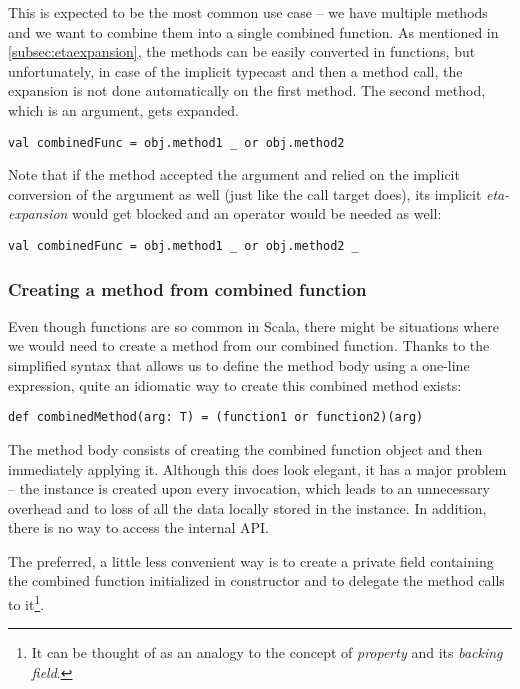 This is expected to be the most common use case -- we have multiple methods and we want to combine them into a single combined function. As mentioned in \ref{subsec:etaexpansion}, the methods can be easily converted in functions, but unfortunately, in case of the implicit typecast and then a method call, the expansion is not done automatically on the first method. The second method, which is an argument, gets expanded.

\lstset{style=Scala}
\begin{lstlisting}
val combinedFunc = obj.method1 _ or obj.method2
\end{lstlisting}

Note that if the  method accepted the  argument and relied on the implicit conversion of the argument as well (just like the call target does), its implicit \textit{eta-expansion} would get blocked and an operator \inlinecode{\_} would be needed as well:

\lstset{style=Scala}
\begin{lstlisting}
val combinedFunc = obj.method1 _ or obj.method2 _
\end{lstlisting}

\subsubsection{Creating a method from combined function}
\label{subsubsec:method_from_combined_func}

Even though functions are so common in Scala, there might be situations where we would need to create a method from our combined function. Thanks to the simplified syntax that allows us to define the method body using a one-line expression, quite an idiomatic way to create this combined method exists:

\lstset{style=Scala}
\begin{lstlisting}
def combinedMethod(arg: T) = (function1 or function2)(arg)
\end{lstlisting}

The method body consists of creating the combined function object and then immediately applying it. Although this does look elegant, it has a major problem -- the  instance is created upon every invocation, which leads to an unnecessary overhead and to loss of all the data locally stored in the instance. In addition, there is no way to access the  internal API.

The preferred, a little less convenient way is to create a private field containing the combined function initialized in constructor and to delegate the method calls to it\footnote{It can be thought of as an analogy to the concept of \textit{property} and its \textit{backing field}.}.
 
